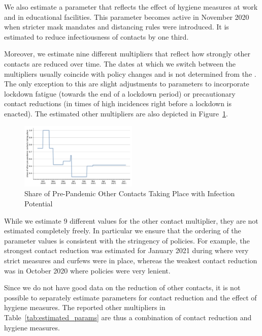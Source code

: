 We also estimate a parameter that reflects the effect of hygiene measures
at work and in educational facilities. This parameter becomes active in November 2020
when stricter mask mandates and distancing rules were introduced. It is estimated to
reduce infectiousness of contacts by one third.

Moreover, we estimate nine different multipliers that reflect how strongly other contacts
are reduced over time. The dates at which we switch between the multipliers usually
coincide with policy changes and is not determined from the . The only exception to this are slight adjustments to parameters to
incorporate lockdown fatigue (towards the end of a lockdown period) or precautionary
contact reductions (in times of high incidences right before a lockdown is enacted). The
estimated other multipliers are also depicted in Figure~\ref{fig:other_multiplier}.

\begin{figure}
    \centering
    \includegraphics[width=0.5\textwidth]{figures/results/figures/data/other_multiplier}
    \caption{Share of Pre-Pandemic Other Contacts Taking Place with Infection Potential}
    \label{fig:other_multiplier}
\end{figure}

While we estimate 9 different values for the other contact multiplier, they are not
estimated completely freely. In particular we ensure that the ordering of the parameter
values is consistent with the stringency of policies. For example, the strongest
contact reduction was estimated for January 2021 during where very strict measures
and curfews were in place, whereas the weakest contact reduction was in October 2020
where policies were very lenient.

Since we do not have good data on the reduction of other contacts, it is not possible
to separately estimate parameters for contact reduction and the effect of hygiene
measures. The reported other multipliers in Table~\ref{tab:estimated_params} are thus
a combination of contact reduction and hygiene measures.

